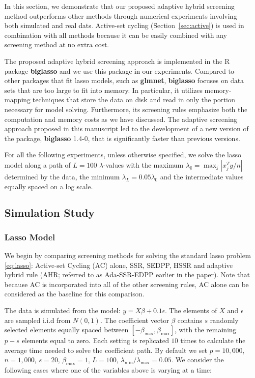 In this section, we demonstrate that our proposed adaptive hybrid screening method outperforms other methods through numerical experiments involving both simulated and real dats. Active-set cycling (Section~\ref{sec:active}) is used in combination with all methods because it can be easily combined with any screening method at no extra cost.

The proposed adaptive hybrid screening approach is implemented in the R package \textbf{biglasso} and we use this package in our experiments. Compared to other packages that fit lasso models, such as \textbf{glmnet}, \textbf{biglasso} focuses on data sets that are too large to fit into memory. In particular, it utilizes memory-mapping techniques that store the data on disk and read in only the portion necessary for model solving. Furthermore, its screening rules emphasize both the computation and memory costs as we have discussed. The adaptive screening approach proposed in this manuscript led to the development of a new version of the package, \textbf{biglasso} 1.4-0, that is significantly faster than previous versions.

For all the following experiments, unless otherwise specified, we solve the lasso model along a path of $L=100$ $\lambda$-values with the maximum $\lambda_0=\max_j|x_j^Ty/n|$ determined by the data, the minimum $\lambda_L=0.05\lambda_0$ and the intermediate values equally spaced on a log scale. 

\subsection{Simulation Study}
\label{sec:sim}

\subsubsection{Lasso Model}

We begin by comparing screening methods for solving the standard lasso problem \eqref{eq:lasso}: Active-set Cycling (AC) alone, SSR, SEDPP, HSSR and adaptive hybrid rule (AHR; referred to as Ada-SSR-EDPP earlier in the paper). Note that because AC is incorporated into all of the other screening rules, AC alone can be considered as the baseline for this comparison.

The data is simulated from the model: $y=X\beta+0.1\epsilon$. The elements of $X$ and $\epsilon$ are sampled i.i.d from $N(0,1)$. The coefficient vector $\beta$ contains $s$ randomly selected elements equally spaced between $[-\beta_{\max},\beta_{\max}]$, with the remaining $p-s$ elements equal to zero. Each setting is replicated $10$ times to calculate the average time needed to solve the coefficient path. By default we set $p=10,000$, $n=1,000$, $s=20$, $\beta_{\max}=1$, $L=100$, $\lambda_{\min}/\lambda_{\max}=0.05$. We consider the following cases where one of the variables above is varying at a time:

